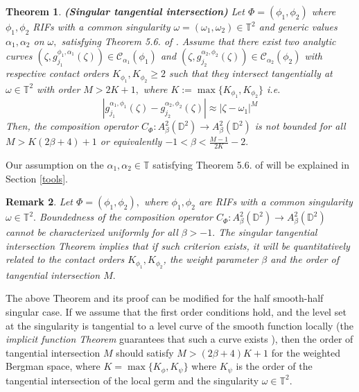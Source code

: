 \documentclass[12pt]{amsart}
\newtheorem{theorem}{Theorem}[section]
\newtheorem{remark}[theorem]{Remark}
\numberwithin{equation}{section}
\begin{document}
\begin{theorem}\label{singlulartangentlines} \textbf{(Singular tangential intersection)} Let $\Phi=(\phi_1,\phi_2)$ where $\phi_1,\phi_2$ RIFs with a common singularity $\omega=(\omega_1,\omega_2)\in\mathbb{T}^2$ and generic values $\alpha_1,\alpha_2$ on $\omega,$ satisfying Theorem 5.6. of \cite{Clark}. Assume that there exist two analytic curves $(\zeta,g_{j_1}^{\phi_1,\alpha_1}(\zeta))\in\mathcal{C}_{{\alpha}_1}(\phi_1)$ and $(\zeta,g^{\alpha_2,\phi_2}_{j_2}(\zeta))\in\mathcal{C}_{\alpha_2}(\phi_2)$ with respective contact orders $K_{\phi_1}, K_{\phi_2}\ge 2$ such that they intersect tangentially at $\omega\in\mathbb{T}^2$ with order $M>2K+1,$ where $K:=\max\{K_{\phi_1},K_{\phi_2}\}$ i.e.
$$|g^{\alpha_1,\phi_1}_{j_1}(\zeta)-g_{j_2}^{\alpha_2,\phi_2}(\zeta)|\approx |\zeta-\omega_1|^M$$
Then, the composition operator $C_{\Phi}:A^2_{\beta}(\mathbb{D}^2)\to A^2_{\beta}(\mathbb{D}^2)$ is not bounded for all $M>K(2\beta+4)+1$ or equivalently $-1<\beta<\frac{M-1}{2K}-2.$  
\end{theorem}
Our assumption on the $\alpha_1,\alpha_2\in\mathbb{T}$ satisfying Theorem 5.6. of \cite{Clark} will be explained in Section \ref{tools}.
\begin{remark} Let $\Phi=(\phi_1,\phi_2),$ where $\phi_1,\phi_2$ are RIFs with a common singularity $\omega\in\mathbb{T}^2.$ Boundedness of the composition operator $C_{\Phi}:A^2_{\beta}(\mathbb{D}^2)\to A^2_{\beta}(\mathbb{D}^2)$ cannot be characterized uniformly for all $\beta>-1.$ The singular tangential intersection Theorem implies that if such criterion exists, it will be quantitatively related to the contact orders $K_{\phi_1}, K_{\phi_2}$, the weight parameter $\beta$ and the order of tangential intersection $M.$ 
\end{remark}
The above Theorem and its proof can be modified for the half smooth-half singular case. If we assume that the first order conditions hold, and the level set at the singularity is tangential to a level curve of the smooth function locally (the \textit{implicit function Theorem} guarantees that such a curve exists ), then the order of tangential intersection $M$ should satisfy $M>(2\beta+4)K+1$ for the weighted Bergman space, where $K=\max\{K_{\phi},K_{\psi}\}$ where $K_{\psi}$ is the order of the tangential intersection of the local germ and the singularity $\omega\in\mathbb{T}^2.$
\end{document}
